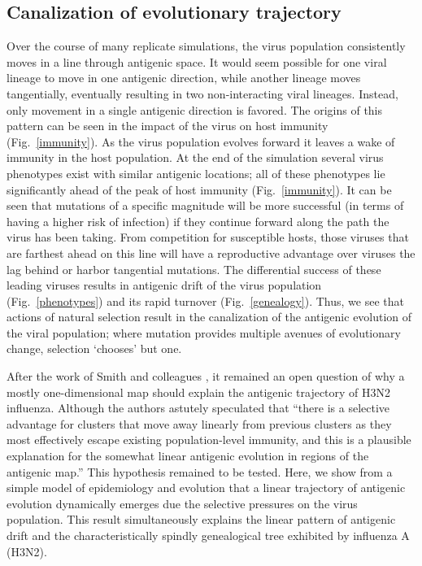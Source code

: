 \documentclass[11pt,oneside,letterpaper]{article}
\begin{document}
\subsection*{Canalization of evolutionary trajectory}

Over the course of many replicate simulations, the virus population consistently moves in a line through antigenic space.  It would seem possible for one viral lineage to move in one antigenic direction, while another lineage moves tangentially, eventually resulting in two non-interacting viral lineages.  Instead, only movement in a single antigenic direction is favored.  The origins of this pattern can be seen in the impact of the virus on host immunity (Fig.~\ref{immunity}).  As the virus population evolves forward it leaves a wake of immunity in the host population.  At the end of the simulation several virus phenotypes exist with similar antigenic locations; all of these phenotypes lie significantly ahead of the peak of host immunity (Fig.~\ref{immunity}).  It can be seen that mutations of a specific magnitude will be more successful (in terms of having a higher risk of infection) if they continue forward along the path the virus has been taking.  From competition for susceptible hosts, those viruses that are farthest ahead on this line will have a reproductive advantage over viruses the lag behind or harbor tangential mutations.  The differential success of these leading viruses results in antigenic drift of the virus population (Fig.~\ref{phenotypes}) and its rapid turnover (Fig.~\ref{genealogy}).  Thus, we see that actions of natural selection result in the canalization of the antigenic evolution of the viral population; where mutation provides multiple avenues of evolutionary change, selection `chooses' but one.

After the work of Smith and colleagues \cite{Smith04}, it remained an open question of why a mostly one-dimensional map should explain the antigenic trajectory of H3N2 influenza.  Although the authors astutely speculated that ``there is a selective advantage for clusters that move away linearly from previous clusters as they most effectively escape existing population-level immunity, and this is a plausible explanation for the somewhat linear antigenic evolution in regions of the antigenic map.''  This hypothesis remained to be tested.  Here, we show from a simple model of epidemiology and evolution that a linear trajectory of antigenic evolution dynamically emerges due the selective pressures on the virus population.  This result simultaneously explains the linear pattern of antigenic drift \cite{Smith04} and the characteristically spindly genealogical tree \cite{Fitch97} exhibited by influenza A (H3N2).
\end{document}
